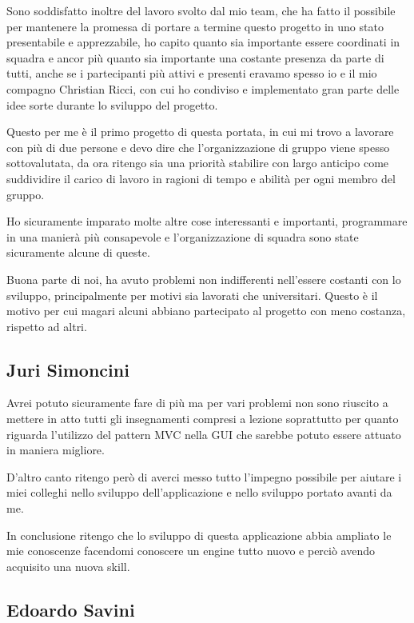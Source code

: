 Sono soddisfatto inoltre del lavoro svolto dal mio team, che ha fatto il possibile per mantenere la promessa di portare a termine questo progetto in uno stato presentabile e apprezzabile, ho capito quanto sia importante essere coordinati in squadra e ancor più quanto sia importante una costante presenza da parte di tutti, anche se i partecipanti più attivi e presenti eravamo spesso io e il mio compagno Christian Ricci, con cui ho condiviso e implementato gran parte delle idee sorte durante lo sviluppo del progetto.   

Questo per me è il primo progetto di questa portata, in cui mi trovo a lavorare con più di due persone e devo dire che l'organizzazione di gruppo viene spesso sottovalutata, da ora ritengo sia una priorità stabilire con largo anticipo come suddividire il carico di lavoro in ragioni di tempo e abilità per ogni membro del gruppo.

Ho sicuramente imparato molte altre cose interessanti e importanti, programmare in una manierà più consapevole e l'organizzazione di squadra sono state sicuramente alcune di queste.

Buona parte di noi, ha avuto problemi non indifferenti nell'essere costanti con lo sviluppo, principalmente per motivi sia lavorati che universitari.
Questo è il motivo per cui magari alcuni abbiano partecipato al progetto con meno costanza, rispetto ad altri.

\subsection{Juri Simoncini}

Avrei potuto sicuramente fare di più ma per vari problemi non sono riuscito a mettere in atto tutti gli insegnamenti compresi a lezione soprattutto per quanto riguarda l'utilizzo del pattern MVC nella GUI che sarebbe potuto essere attuato in maniera migliore.

D'altro canto ritengo però di averci messo tutto l'impegno possibile per aiutare i miei colleghi nello sviluppo dell'applicazione e nello sviluppo portato avanti da me.

In conclusione ritengo che lo sviluppo di questa applicazione abbia ampliato le mie conoscenze facendomi conoscere un engine tutto nuovo e perciò avendo acquisito una nuova skill.

\subsection{Edoardo Savini}

